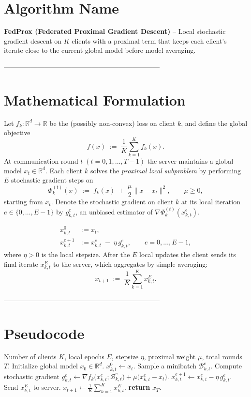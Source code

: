 \documentclass{article}
\newcommand{\RR}{\mathbb{R}}
\begin{document}
\section*{Algorithm Name}
\textbf{FedProx (Federated Proximal Gradient Descent)} – Local stochastic gradient descent on $K$ clients with a proximal term that keeps each client’s iterate close to the current global model before model averaging.

---------------------------------------------------------------------

\section*{Mathematical Formulation}
Let $f_k:\RR^{d}\!\to\!\RR$ be the (possibly non‑convex) loss on client $k$, and define the global objective
\[
f(x)\;:=\;\frac{1}{K}\sum_{k=1}^{K}f_k(x).
\]
At communication round $t\;(t=0,1,\dots,T-1)$ the server maintains a global model $x_t\in\RR^{d}$.  
Each client $k$ solves the \emph{proximal local subproblem} by performing $E$ stochastic gradient steps on
\[
\Phi_k^{(t)}(x)\;:=\;f_k(x)\;+\;\frac{\mu}{2}\|x-x_t\|^{2},
\qquad \mu\ge 0,
\]
starting from $x_t$.  
Denote the stochastic gradient on client $k$ at its local iteration $e\in\{0,\dots,E-1\}$ by $g_{k,t}^{e}$, an unbiased estimator of $\nabla \Phi_k^{(t)}(x_{k,t}^{e})$.

\[
\begin{aligned}
x_{k,t}^{0} &:= x_t,\\
x_{k,t}^{e+1} &:= x_{k,t}^{e}\;-\;\eta\, g_{k,t}^{e},
\qquad e=0,\dots,E-1,
\end{aligned}
\]
where $\eta>0$ is the local stepsize.  
After the $E$ local updates the client sends its final iterate $x_{k,t}^{E}$ to the server, which aggregates by simple averaging:
\[
x_{t+1}\;:=\;\frac{1}{K}\sum_{k=1}^{K}x_{k,t}^{E}.
\]

---------------------------------------------------------------------

\section*{Pseudocode}
\begin{algorithm}[H]
\caption{FedProx}
\begin{algorithmic}[1]
\Require Number of clients $K$, local epochs $E$, stepsize $\eta$, proximal weight $\mu$, total rounds $T$.
\State Initialize global model $x_{0}\in\RR^{d}$.
        \State $x_{k,t}^{0}\gets x_{t}$.
            \State Sample a minibatch $\mathcal{B}_{k,t}^{e}$.
            \State Compute stochastic gradient 
            $\displaystyle g_{k,t}^{e}\gets \nabla f_k\bigl(x_{k,t}^{e};\mathcal{B}_{k,t}^{e}\bigr)
                +\mu\bigl(x_{k,t}^{e}-x_{t}\bigr)$.
            \State $x_{k,t}^{e+1}\gets x_{k,t}^{e}-\eta\, g_{k,t}^{e}$.
        \EndFor
        \State Send $x_{k,t}^{E}$ to server.
    \EndFor
    \State $x_{t+1}\gets\frac{1}{K}\sum_{k=1}^{K}x_{k,t}^{E}$.
\EndFor
\State \textbf{return} $x_{T}$.
\end{algorithmic}
\end{algorithm}
\end{document}
